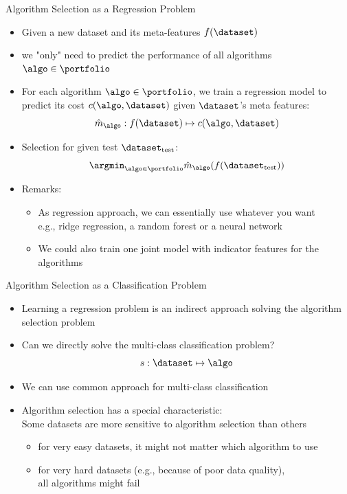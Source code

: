 \begin{frame}[c]{Algorithm Selection as a Regression Problem}

\begin{itemize}
	\item Given a new dataset and its meta-features $f(\dataset)$
	\item we "only" need to predict the performance of all algorithms $\algo \in \portfolio$
	\item For each algorithm $\algo \in \portfolio$, we train a regression model to predict its cost $c(\algo,\dataset)$ given $\dataset$'s meta features:
	$$\hat{m}_\algo: f(\dataset) \mapsto c(\algo, \dataset) $$
	\pause
	\item Selection for given test $\dataset_{\text{test}}$:
	$$\argmin_{\algo \in \portfolio} \hat{m}_\algo(f(\dataset_{\text{test}}))$$
	\pause
	\item Remarks:
	\begin{itemize}
		\item As regression approach, we can essentially use whatever you want\\
		e.g., ridge regression, a random forest or a neural network
		\item We could also train one joint model with indicator features for the algorithms
	\end{itemize}
\end{itemize}


\end{frame}
\begin{frame}[c]{Algorithm Selection as a Classification Problem}

\begin{itemize}
	\item Learning a regression problem is an indirect approach solving the algorithm selection problem
	\pause
	\item Can we directly solve the multi-class classification problem?
	$$s: \dataset \mapsto \algo$$
	\pause
	\item We can use common approach for multi-class classification
	\item Algorithm selection has a special characteristic:\\
	\alert{Some datasets are more sensitive to algorithm selection than others}
	\begin{itemize}
		\item for very easy datasets, it might not matter which algorithm to use
		\item for very hard datasets (e.g., because of poor data quality),\\ all algorithms might fail
	\end{itemize}
	
\end{itemize}


\end{frame}
